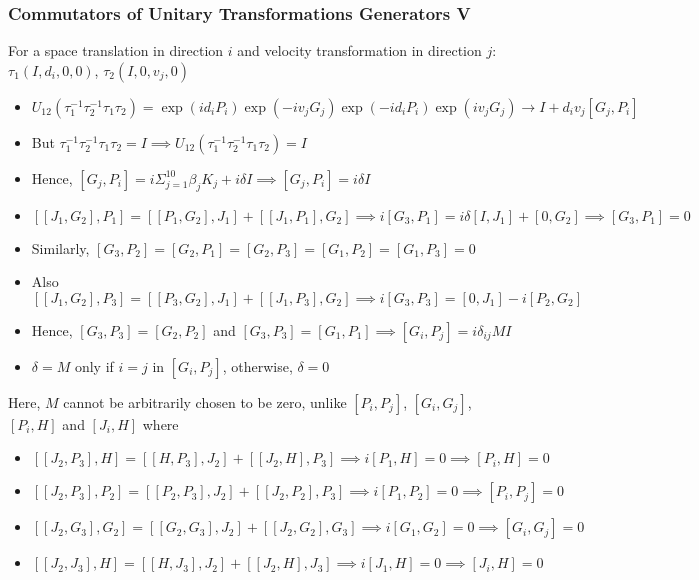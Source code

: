 \documentclass[8pt,t,mathserif,aspectratio=169]{beamer}
\begin{document}
\begin{frame}
  \frametitle{Commutators of Unitary Transformations Generators V}
  \vspace{1mm}
  For a space translation in direction $i$ and velocity transformation in direction $j$: $\tau_1(I,d_i,0,0)$, $\tau_2(I,0,v_j,0)$
  \begin{itemize}
    \item $U_{12}(\tau^{-1}_1 \tau^{-1}_2 \tau_1 \tau_2) = \exp(i d_i P_i) \exp(-i v_j G_j) \exp(-i d_i P_i) \exp(i v_j G_j) \to I + d_i v_j [G_j,P_i]$
    \item But $\tau^{-1}_1 \tau^{-1}_2 \tau_1 \tau_2 = I \implies U_{12}(\tau^{-1}_1 \tau^{-1}_2 \tau_1 \tau_2) = I$
    \item Hence, $[G_j,P_i] = i \Sigma_{j = 1}^{10} \beta_j K_j + i \delta I \implies [G_j,P_i] = i \delta I$
    \item $[[J_1,G_2],P_1] = [[P_1,G_2],J_1] + [[J_1,P_1],G_2] \implies i[G_3,P_1] = i \delta [I,J_1] + [0,G_2] \implies [G_3,P_1] = 0$
    \item Similarly, $[G_3,P_2] = [G_2,P_1] = [G_2,P_3] = [G_1,P_2] = [G_1,P_3] = 0$
    \item Also $[[J_1,G_2],P_3] = [[P_3,G_2],J_1] + [[J_1,P_3],G_2] \implies i[G_3,P_3] = [0,J_1] -i [P_2,G_2]$
    \item Hence, $[G_3,P_3] = [G_2,P_2]$ and $[G_3,P_3] = [G_1,P_1] \implies [G_i,P_j] = i \delta_{ij} M I$
    \item $\delta = M$ only if $i = j$ in $[G_i,P_j]$, otherwise, $\delta = 0$
  \end{itemize}
  Here, $M$ cannot be arbitrarily chosen to be zero, unlike $[P_i,P_j]$, $[G_i,G_j]$, $[P_i,H]$ and $[J_i,H]$ where
  \begin{itemize}
    \item $[[J_2,P_3],H] = [[H,P_3],J_2] + [[J_2,H],P_3] \implies i[P_1,H] = 0 \implies [P_i,H] = 0$
    \item $[[J_2,P_3],P_2] = [[P_2,P_3],J_2] + [[J_2,P_2],P_3] \implies i[P_1,P_2] = 0 \implies [P_i,P_j] = 0$
    \item $[[J_2,G_3],G_2] = [[G_2,G_3],J_2] + [[J_2,G_2],G_3] \implies i[G_1,G_2] = 0 \implies [G_i,G_j] = 0$
    \item $[[J_2,J_3],H] = [[H,J_3],J_2] + [[J_2,H],J_3] \implies i[J_1,H] = 0 \implies [J_i,H] = 0$
  \end{itemize}
\end{frame}
\end{document}
